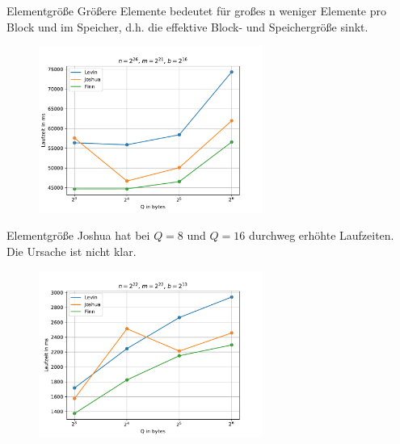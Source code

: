 \documentclass[ngerman,aspectratio=169,10pt]{beamer}
\begin{document}
\begin{frame}{Elementgröße}
Größere Elemente bedeutet für großes n weniger Elemente pro Block und im Speicher, d.h. die effektive Block- und Speichergröße sinkt.
\vspace{-10pt}
\begin{figure}[H]
    \centering
    \includegraphics[width=0.65\textwidth]{q__n_67108864_m_2097152_b_65536.pdf}
    \label{fig:f3}
\end{figure}
\end{frame}

\begin{frame}{Elementgröße}
Joshua hat bei $Q=8$ und $Q=16$ durchweg erhöhte Laufzeiten. Die Ursache ist nicht klar.
\vspace{-10pt}
\begin{figure}[H]
    \centering
    \includegraphics[width=0.65\textwidth]{q__n_4194304_m_4194304_b_8192.pdf}
    \label{fig:f4}
\end{figure}
\end{frame}
\end{document}
